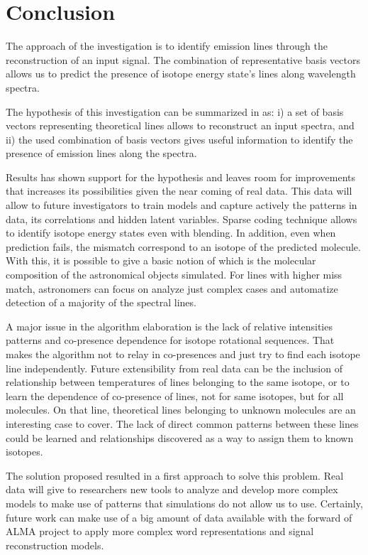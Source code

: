 \section{Conclusion} \label{sec:conclusions}

\begin{comment}
  - Remember hypothesis
  - Results support hypothesis
  - Reached objective proposed in the focus of the problem
  - With some exceptions, results archived
  - Extensibility
  - Next steps
\end{comment}

The approach of the investigation is to identify emission lines through the reconstruction of an input signal.
The combination of representative basis vectors allows us to predict the presence of isotope energy state's lines along wavelength spectra. 

The hypothesis of this investigation can be summarized in as:
i) a set of basis vectors representing theoretical lines allows to reconstruct an input spectra, and
ii) the used combination of basis vectors gives useful information to identify the presence of emission lines along the spectra.

Results has shown support for the hypothesis and leaves room for improvements that increases its possibilities given the near coming of real data.
This data will allow to future investigators to train models and capture actively the patterns in data, its correlations and hidden latent variables.
Sparse coding technique allows to identify isotope energy states even with blending.
In addition, even when prediction fails, the mismatch correspond to an isotope of the predicted molecule.
With this, it is possible to give a basic notion of which is the molecular composition of the astronomical objects simulated.
For lines with higher miss match, astronomers can focus on analyze just complex cases and automatize detection of a majority of the spectral lines.

A major issue in the algorithm elaboration is the lack of relative intensities patterns and co-presence dependence for isotope rotational sequences.
That makes the algorithm not to relay in co-presences and just try to find each isotope line independently.
Future extensibility from real data can be the inclusion of relationship between temperatures of lines belonging to the same isotope, or to learn the dependence of co-presence of lines, not for same isotopes, but for all molecules.
On that line, theoretical lines belonging to unknown molecules are an interesting case to cover.
The lack of direct common patterns between these lines could be learned and relationships discovered as a way to assign them to known isotopes. 

The solution proposed resulted in a first approach to solve this problem.
Real data will give to researchers new tools to analyze and develop more complex models to make use of patterns that simulations do not allow us to use.
Certainly, future work can make use of a big amount of data available with the forward of ALMA project to apply more complex word representations and signal reconstruction models.